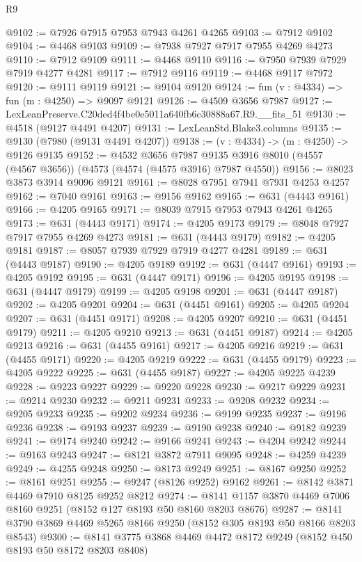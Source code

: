 \begin{lexlean}{R9}
\begin{coremodule}
@9102 := @7926 @7915 @7953 @7943 @4261 @4265
@9103 := @7912 @9102
@9104 := @4468 @9103
@9109 := @7938 @7927 @7917 @7955 @4269 @4273
@9110 := @7912 @9109
@9111 := @4468 @9110
@9116 := @7950 @7939 @7929 @7919 @4277 @4281
@9117 := @7912 @9116
@9119 := @4468 @9117 @7972
@9120 := @9111 @9119
@9121 := @9104 @9120
@9124 := fun (v : @4334) => fun (m : @4250) => @9097 @9121
@9126 := @4509 @3656 @7987
@9127 := LexLeanPreserve.C20ded4f4be0e5011a640fb6c30888a67.R9.__fits_51
@9130 := @4518 (@9127 @4491 @4207)
@9131 := LexLeanStd.Blake3.columns
@9135 := @9130 (@7980 (@9131 @4491 @4207))
@9138 := (v : @4334) -> (m : @4250) -> @9126 @9135
@9152 := @4532
    @3656
    @7987
    @9135
    @3916
    @8010
    (@4557 (@4567 @3656))
    (@4573 (@4574 (@4575 @3916) @7987 @4550))
@9156 := @8023 @3873 @3914 @9096 @9121
@9161 := @8028 @7951 @7941 @7931 @4253 @4257
@9162 := @7040 @9161
@9163 := @9156 @9162
@9165 := @631 (@4443 @9161)
@9166 := @4205 @9165
@9171 := @8039 @7915 @7953 @7943 @4261 @4265
@9173 := @631 (@4443 @9171)
@9174 := @4205 @9173
@9179 := @8048 @7927 @7917 @7955 @4269 @4273
@9181 := @631 (@4443 @9179)
@9182 := @4205 @9181
@9187 := @8057 @7939 @7929 @7919 @4277 @4281
@9189 := @631 (@4443 @9187)
@9190 := @4205 @9189
@9192 := @631 (@4447 @9161)
@9193 := @4205 @9192
@9195 := @631 (@4447 @9171)
@9196 := @4205 @9195
@9198 := @631 (@4447 @9179)
@9199 := @4205 @9198
@9201 := @631 (@4447 @9187)
@9202 := @4205 @9201
@9204 := @631 (@4451 @9161)
@9205 := @4205 @9204
@9207 := @631 (@4451 @9171)
@9208 := @4205 @9207
@9210 := @631 (@4451 @9179)
@9211 := @4205 @9210
@9213 := @631 (@4451 @9187)
@9214 := @4205 @9213
@9216 := @631 (@4455 @9161)
@9217 := @4205 @9216
@9219 := @631 (@4455 @9171)
@9220 := @4205 @9219
@9222 := @631 (@4455 @9179)
@9223 := @4205 @9222
@9225 := @631 (@4455 @9187)
@9227 := @4205 @9225 @4239
@9228 := @9223 @9227
@9229 := @9220 @9228
@9230 := @9217 @9229
@9231 := @9214 @9230
@9232 := @9211 @9231
@9233 := @9208 @9232
@9234 := @9205 @9233
@9235 := @9202 @9234
@9236 := @9199 @9235
@9237 := @9196 @9236
@9238 := @9193 @9237
@9239 := @9190 @9238
@9240 := @9182 @9239
@9241 := @9174 @9240
@9242 := @9166 @9241
@9243 := @4204 @9242
@9244 := @9163 @9243
@9247 := @8121 @3872 @7911 @9095
@9248 := @4259 @4239
@9249 := @4255 @9248
@9250 := @8173 @9249
@9251 := @8167 @9250
@9252 := @8161 @9251
@9255 := @9247 (@8126 @9252) @9162
@9261 := @8142 @3871 @4469 @7910 @8125 @9252 @8212
@9274 := @8141 @1157 @3870 @4469 @7006 @8160 @9251 (@8152 @127 @8193 @50 @8160 @8203 @8676)
@9287 := @8141 @3790 @3869 @4469 @5265 @8166 @9250 (@8152 @305 @8193 @50 @8166 @8203 @8543)
@9300 := @8141 @3775 @3868 @4469 @4472 @8172 @9249 (@8152 @450 @8193 @50 @8172 @8203 @8408)

\end{coremodule}
\end{lexlean}
